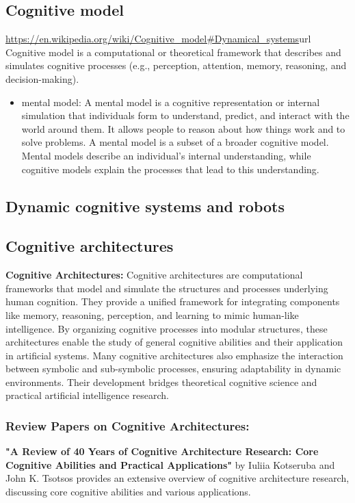     \subsection{Cognitive model} \url{https://en.wikipedia.org/wiki/Cognitive_model#Dynamical_systems}{url}
        Cognitive model is a computational or theoretical framework that describes and simulates cognitive processes (e.g., perception, attention, memory, reasoning, and decision-making).
        \begin{itemize}
            \item mental model: A mental model is a cognitive representation or internal simulation that individuals form to understand, predict, and interact with the world around them. It allows people to reason about how things work and to solve problems. A mental model is a subset of a broader cognitive model. Mental models describe an individual's internal understanding, while cognitive models explain the processes that lead to this understanding.
        \end{itemize}
    \subsection {Dynamic cognitive systems and robots}

    \subsection{Cognitive architectures}
        \textbf{Cognitive Architectures:} Cognitive architectures are computational frameworks that model and simulate the structures and processes underlying human cognition. They provide a unified framework for integrating components like memory, reasoning, perception, and learning to mimic human-like intelligence. By organizing cognitive processes into modular structures, these architectures enable the study of general cognitive abilities and their application in artificial systems. Many cognitive architectures also emphasize the interaction between symbolic and sub-symbolic processes, ensuring adaptability in dynamic environments. Their development bridges theoretical cognitive science and practical artificial intelligence research. 

        \subsubsection{Review Papers on Cognitive Architectures:}

            \textbf{"A Review of 40 Years of Cognitive Architecture Research: Core Cognitive Abilities and Practical Applications"} by Iuliia Kotseruba and John K. Tsotsos provides an extensive overview of cognitive architecture research, discussing core cognitive abilities and various applications. 

